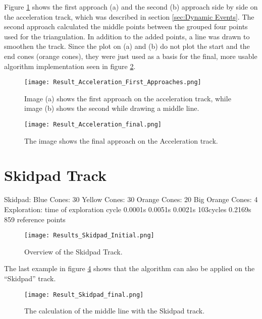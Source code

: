 Figure \ref{fig:Result Acceleration First Approaches} shows the first approach (a) and the second (b) approach side by side on the acceleration track, which was described in section \ref{sec:Dynamic Events}. The second approach calculated the middle points between the grouped four points used for the triangulation. In addition to the added points, a line was drawn to smoothen the track. Since the plot on (a) and (b) do not plot the start and the end cones (orange cones), they were just used as a basis for the final, more usable algorithm implementation seen in figure \ref{fig:Result Acceleration Final}.
\begin{figure}[H]
    \centering
    \texttt{[image: Result\_Acceleration\_First\_Approaches.png]}
    \caption{Image (a) shows the first approach on the acceleration track, while image (b) shows the second while drawing a middle line.}
    \label{fig:Result Acceleration First Approaches}
\end{figure}
\begin{figure}[H]
    \centering
    \texttt{[image: Result\_Acceleration\_final.png]}
    \caption{The image shows the final approach on the Acceleration track.}
    \label{fig:Result Acceleration Final}
\end{figure}

\section{Skidpad Track} \label{sec:Results Skidpad Track}
Skidpad:
Blue Cones: 30
Yellow Cones: 30
Orange Cones: 20
Big Orange Cones: 4
Exploration:
time of exploration cycle
0.0001s 0.0051s 0.0021s 103cycles 0.2169s
859 reference points

\begin{figure}[H]
    \centering
    \texttt{[image: Results\_Skidpad\_Initial.png]}
    \caption{Overview of the Skidpad Track.}
    \label{fig:Results Skidpad Initial}
\end{figure}

The last example in figure \ref{fig:Result Skidpad Final} shows that the algorithm can also be applied on the ``Skidpad'' track.
\begin{figure}[H]
    \centering
    \texttt{[image: Result\_Skidpad\_final.png]}
    \caption{The calculation of the middle line with the Skidpad track.}
    \label{fig:Result Skidpad Final}
\end{figure}

